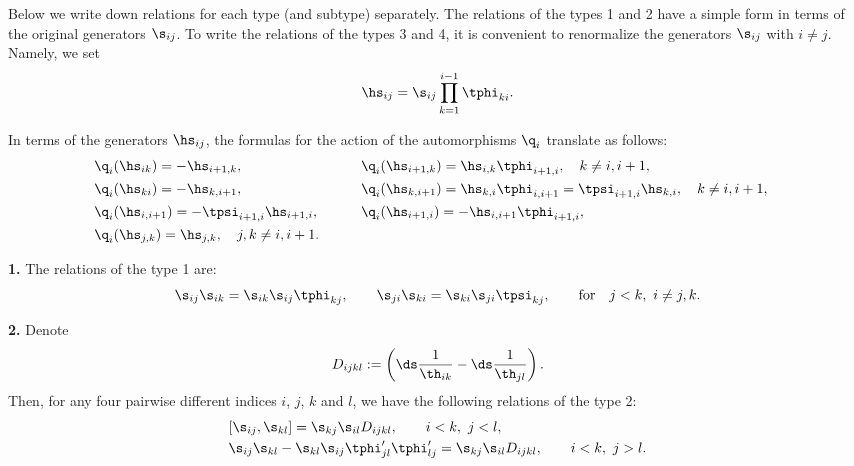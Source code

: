 Below we write down relations for each type (and subtype) separately. The relations of the types 1 and 2 have a simple form in terms of the original
generators $\s_{ij}$. To write the relations  of the types 3 and 4, it is convenient to renormalize the generators $\s_{ij}$
with $i\not=j$. Namely, we set
\begin{gather}
\label{not8}\hs_{ij}=\s_{ij}\prod_{k=1}^{i-1}\tphi_{ki}  .
\end{gather}

In terms of the generators $\hs_{ij}$, the formulas  for the action of the automorphisms $\q_i$  translate as follows:
\begin{alignat*}{3}
& \q_{i}(\hs_{ik})=-\hs_{i+1,k} ,\qquad &&  \q_{i}(\hs_{i+1,k})=\hs_{i,k}\tphi_{i+1,i} ,\quad k\not=i,i+1 , & \\
&\q_{i}(\hs_{ki})=-\hs_{k,i+1} ,\qquad && \q_{i}(\hs_{k,i+1})=\hs_{k,i}\tphi_{i,i+1}=\tpsi_{i+1,i}\hs_{k,i} ,\quad k\not=i,i+1,&
\\
&\q_{i}(\hs_{i,i+1})=-\tpsi_{i+1,i}\hs_{i+1,i} , \qquad &&\q_{i}(\hs_{i+1,i})=-\hs_{i,i+1}\tphi_{i+1,i} ,& \\
 &\q_{i}(\hs_{j,k})=\hs_{j,k} , \quad j,k\neq i,i+1 .\qquad &&&
 \end{alignat*}

{\bf 1.} The relations of  the type 1 are:
\begin{gather}\label{relation1}
\s_{ij}\s_{ik}=\s_{ik}\s_{ij}\tphi_{kj} ,\qquad
\s_{ji}\s_{ki}=\s_{ki}\s_{ji}\tpsi_{kj} ,\qquad \text{for}\quad j<k ,\  i\not=j,k .
\end{gather}

{\bf 2.} Denote
\begin{gather*}
D_{ijkl}:=\left( {\ds\frac{1}{\th_{ik}}}-{\ds\frac{1}{\th_{jl}}}\right).
\end{gather*}
Then, for any four pairwise dif\/ferent indices $i$, $j$, $k$ and $l$, we have the following relations of the type 2:
\begin{gather}
\begin{split}
& [ \s_{ij},\s_{kl} ]=\s_{kj}\s_{il}D_{ijkl} , \qquad i<k ,\ j<l  , \\ %
& \s_{ij}\s_{kl}-\s_{kl}\s_{ij}\tphi_{jl}'\tphi_{lj}'=\s_{kj}\s_{il}
D_{ijkl} ,\qquad i<k ,\ j>l.
\end{split} \label{relation2}
\end{gather}

